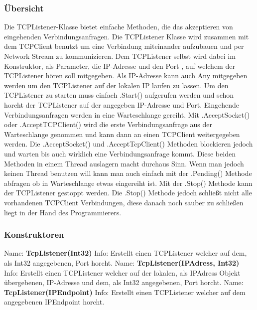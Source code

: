 \subsubsection{Übersicht}
Die TCPListener-Klasse bietet einfache Methoden, die das akzeptieren von eingehenden Verbindungsanfragen. Die TCPListener Klasse wird zusammen mit dem TCPClient benutzt um eine Verbindung miteinander aufzubauen und per Network Stream zu kommunizieren. Dem TCPListener selbst wird dabei im Konstruktor, als Parameter, die IP-Adresse und den Port , auf welchem der TCPListener hören soll mitgegeben. Als IP-Adresse kann auch Any mitgegeben werden um den TCPListener auf der lokalen IP laufen zu lassen. Um den TCPListener zu starten muss einfach .Start() aufgerufen werden und schon horcht der TCPListener auf der angegeben IP-Adresse und Port. Eingehende Verbindungsanfragen werden in eine Warteschlange gereiht. Mit .AcceptSocket() oder .AcceptTCPClient() wird die erste Verbindungsanfrage aus der Warteschlange genommen und kann dann an einen TCPClient weitergegeben werden. Die .AcceptSocket() und .AcceptTcpClient() Methoden blockieren jedoch und warten bis auch wirklich eine Verbindungsanfrage kommt. Diese beiden Methoden in einem Thread auslagern macht durchaus Sinn. Wenn man jedoch keinen Thread benutzen will kann man auch einfach mit der .Pending() Methode abfragen ob in Warteschlange etwas eingereiht ist. Mit der .Stop() Methode kann der TCPListener gestoppt werden. Die .Stop() Methode jedoch schließt nicht alle vorhandenen TCPClient Verbindungen, diese danach noch sauber zu schließen liegt in der Hand des Programmierers.
\subsubsection{Konstruktoren}
Name: \textbf{TcpListener(Int32)}
\newline
Info: Erstellt einen TCPListener welcher auf dem, als Int32 angegebenen, Port horcht.
\newline \newline
Name: \textbf{TcpListener(IPAdress, Int32)}
\newline
Info:  Erstellt einen TCPListener welcher auf der lokalen, als IPAdress Objekt übergebenen, IP-Adresse und dem, als Int32 angegebenen, Port horcht.
\newline \newline
Name: \textbf{TcpListener(IPEndpoint)}
\newline
Info: Erstellt einen TCPListener welcher auf dem angegebenen IPEndpoint horcht.
\newline \newline
